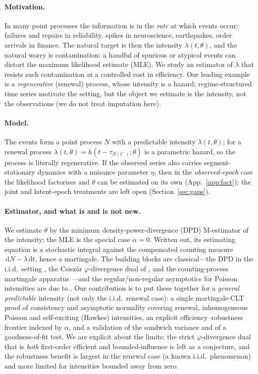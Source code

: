 \documentclass[smallextended,natbib]{svjour3}
\newcommand{\dd}{\,\mathrm{d}}
\begin{document}
\paragraph{Motivation.}
In many point processes the information is in the \emph{rate} at which events
occur: failures and repairs in reliability, spikes in neuroscience, earthquakes,
order arrivals in finance. The natural target is then the intensity
$\lambda(t,\theta)$, and the natural worry is contamination: a handful of spurious
or atypical events can distort the maximum likelihood estimate (MLE). We study an
estimator of $\lambda$ that resists such contamination at a controlled cost in
efficiency. Our leading example is a \emph{regenerative} (renewal) process, whose
intensity is a hazard; regime-structured time series motivate the setting, but the
object we estimate is the intensity, not the observations (we do not treat
imputation here).

\paragraph{Model.}
The events form a point process $N$ with a predictable intensity
$\lambda(t,\theta)$; for a renewal process
$\lambda(t,\theta)=h(t-\tau_{N(t^-)};\theta)$ is a parametric hazard, so the
process is literally regenerative. If the observed series also carries
segment-stationary dynamics with a nuisance parameter $\eta$, then in the
\emph{observed-epoch} case the likelihood factorises and $\theta$ can be estimated
on its own (App.~\ref{app:fact}); the joint and latent-epoch treatments are left
open (Section~\ref{sec:gaps}).

\paragraph{Estimator, and what is and is not new.}
We estimate $\theta$ by the minimum density-power-divergence (DPD) M-estimator
\citep{basu1998} of the intensity; the MLE is the special case $\alpha=0$. Written
out, its estimating equation is a stochastic integral against the compensated
counting measure $\dd N-\lambda\dd t$, hence a martingale. The building blocks are
classical---the DPD in the i.i.d.\ setting \citep{basu1998}, the Csiszár
$\varphi$-divergence dual of \citet{bk2006,bk2009}, and the counting-process
martingale apparatus \citep{bremaud1981,abgk1993,rebolledo1980}---and the
regular/non-regular asymptotics for Poisson intensities are due to
\citet{kutoyants1984,kutoyants1998,ih1981,dachian2003}. Our contribution is to put
these together for a \emph{general predictable} intensity (not only the i.i.d.\
renewal case): a single martingale-CLT proof of consistency and asymptotic
normality covering renewal, inhomogeneous Poisson and self-exciting (Hawkes)
intensities, an explicit efficiency--robustness frontier indexed by $\alpha$, and a
validation of the sandwich variance and of a goodness-of-fit test. We are explicit
about the limits: the strict $\varphi$-divergence dual that is \emph{both}
first-order efficient and bounded-influence is left as a conjecture, and the
robustness benefit is largest in the renewal case (a known i.i.d.\ phenomenon) and
more limited for intensities bounded away from zero.
\end{document}
